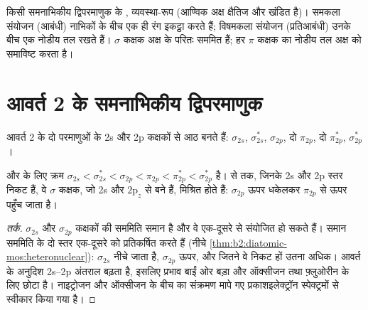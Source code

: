 \begin{omfigure}

{\small किसी समनाभिकीय द्विपरमाणुक के , व्यवस्था-रूप (आण्विक
अक्ष क्षैतिज और खंडित है)। समकला संयोजन (आबंधी) नाभिकों के बीच
एक ही रंग इकट्ठा करते हैं; विषमकला संयोजन (प्रतिआबंधी) उनके बीच एक
नोडीय तल रखते हैं। $\sigma$ कक्षक अक्ष के परितः सममित हैं; हर $\pi$
कक्षक का नोडीय तल अक्ष को समाविष्ट करता है।}
\end{omfigure}

\section{आवर्त 2 के समनाभिकीय द्विपरमाणुक}

आवर्त 2 के दो परमाणुओं के 2s और 2p कक्षकों से आठ 
बनते हैं: $\sigma_{2s}$, $\sigma^*_{2s}$, $\sigma_{2p}$, दो $\pi_{2p}$, दो $\pi^*_{2p}$,
$\sigma^*_{2p}$।

\begin{proposition}[s और p का मिश्रण]\label{prop:b2:diatomic-mos:sp-mixing}
 और  के लिए क्रम $\sigma_{2s} < \sigma^*_{2s} < \sigma_{2p} < \pi_{2p} <
\pi^*_{2p} < \sigma^*_{2p}$ है।  से  तक, जिनके 2s और 2p स्तर निकट हैं,
वे $\sigma$ कक्षक, जो 2s और $2\mathrm p_z$ से बने हैं, मिश्रित होते हैं: $\sigma_{2p}$ ऊपर धकेलकर
$\pi_{2p}$ से ऊपर पहुँच जाता है।
\end{proposition}

\begin{proof}[तर्क]
$\sigma_{2s}$ और $\sigma_{2p}$ कक्षकों की सममिति समान है और वे एक-दूसरे से
संयोजित हो सकते हैं। समान सममिति के दो स्तर एक-दूसरे को प्रतिकर्षित करते हैं (नीचे
\cref{thm:b2:diatomic-mos:heteronuclear}): $\sigma_{2s}$ नीचे जाता है, $\sigma_{2p}$ ऊपर, और जितने
वे निकट हों उतना अधिक। आवर्त के अनुदिश 2s--2p अंतराल बढ़ता है, इसलिए प्रभाव बाईं ओर बड़ा
और ऑक्सीजन तथा फ़्लुओरीन के लिए छोटा है। नाइट्रोजन और ऑक्सीजन के बीच का संक्रमण
मापे गए प्रकाशइलेक्ट्रॉन स्पेक्ट्रमों से स्वीकार किया गया है।
\end{proof}

